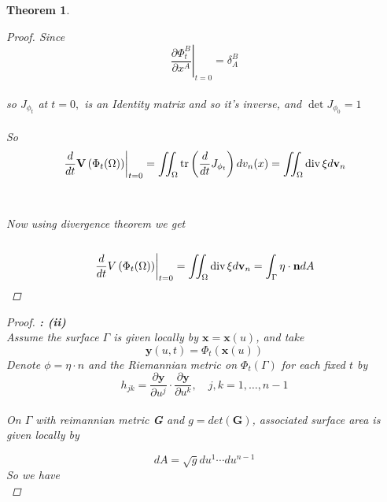 \documentclass[oneside]{book}
\newtheorem{theorem}{Theorem}[section]
\begin{document}
\begin{theorem}
\begin{proof}
 Since \\
  $$\left.\frac{\partial \Phi_{t}^{B}}{\partial x^{A}}\right|_{t=0}=\delta_{A}^{B} $$
  \\
   so  $J_{\phi_{t}} $ at $t = 0,$ is an Identity matrix and so it's inverse, and  $\operatorname{det} J_{\phi_{0}} = 1$\\\\
 So \\
 \begin{equation}
  \label{eq28}
  \left.\frac{d}{d t} \mathbf{V}\left(\Phi_{t}(\Omega)\right)\right|_{t=0} = \iint_{\Omega}\operatorname{tr}\left(\frac{d}{d t} J_{\phi_{t}}\right) d v_{n}(x) = \iint_{\Omega} \operatorname{div} \xi d \mathbf{v}_{n} \\\\
  \end{equation} \\\\
  Now using divergence theorem we get \\\\
 \begin{equation}
  \label{eq29}
  \left.\frac{d}{d t} V\left(\Phi_{t}(\Omega)\right)\right|_{t=0}=\iint_{\Omega} \operatorname{div} \xi d \mathbf{v}_{n}=\int_{\Gamma} \eta \cdot \mathbf{n} d A \\\\
 \end{equation}

 
 
 \end{proof}
 \begin{proof}
 
 
 \textbf{: (ii)} 
 \\
 Assume the surface $\Gamma$ is given locally by $\mathbf{x}=\mathbf{x}(u)$, and take \\
$$
\mathbf{y}(u, t)=\Phi_{t}(\mathbf{x}(u))
$$
Denote $\phi = \eta\cdot{n}$ and the Riemannian metric on $\Phi_{t}(\Gamma)$ for each fixed $t$ by 
\begin{equation}
 \label{eq30}
h_{j k}=\frac{\partial \mathbf{y}}{\partial u^{j}} \cdot \frac{\partial \mathbf{y}}{\partial u^{k}}, \quad j, k=1, \ldots, n-1
\end{equation} \\
On $\Gamma$ with reimannian metric \textbf{G} and  $g=det(\textbf{G})$, associated surface area is given locally by 

\begin{equation}
\label{eq31}
    d A=\sqrt{g} d u^{1} \cdots d u^{n-1}
\end{equation} 
So we have \\


\end{proof}
\end{theorem}
\end{document}
